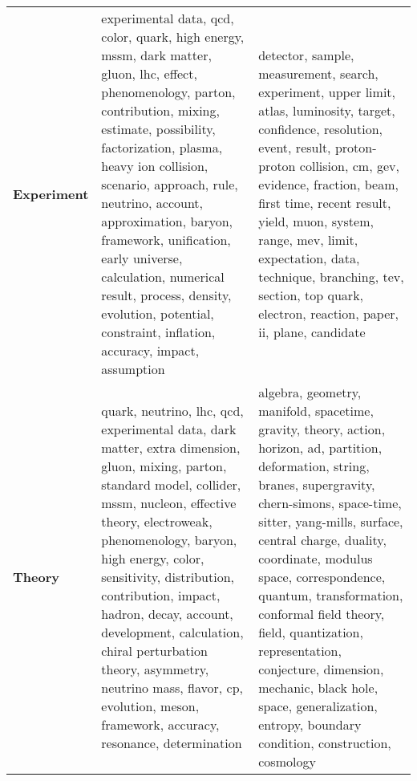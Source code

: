 \begin{longtable}{p{3cm}|p{5cm}|p{5cm}}
\bottomrule
\endlastfoot
\textbf{Experiment} &            experimental data, qcd, color, quark, high energy, mssm, dark matter, gluon, lhc, effect, phenomenology, parton, contribution, mixing, estimate, possibility, factorization, plasma, heavy ion collision, scenario, approach, rule, neutrino, account, approximation, baryon, framework, unification, early universe, calculation, numerical result, process, density, evolution, potential, constraint, inflation, accuracy, impact, assumption &                                                                                             detector, sample, measurement, search, experiment, upper limit, atlas, luminosity, target, confidence, resolution, event, result, proton-proton collision, cm, gev, evidence, fraction, beam, first time, recent result, yield, muon, system, range, mev, limit, expectation, data, technique, branching, tev, section, top quark, electron, reaction, paper, ii, plane, candidate \\
\textbf{Theory    } &  quark, neutrino, lhc, qcd, experimental data, dark matter, extra dimension, gluon, mixing, parton, standard model, collider, mssm, nucleon, effective theory, electroweak, phenomenology, baryon, high energy, color, sensitivity, distribution, contribution, impact, hadron, decay, account, development, calculation, chiral perturbation theory, asymmetry, neutrino mass, flavor, cp, evolution, meson, framework, accuracy, resonance, determination &  algebra, geometry, manifold, spacetime, gravity, theory, action, horizon, ad, partition, deformation, string, branes, supergravity, chern-simons, space-time, sitter, yang-mills, surface, central charge, duality, coordinate, modulus space, correspondence, quantum, transformation, conformal field theory, field, quantization, representation, conjecture, dimension, mechanic, black hole, space, generalization, entropy, boundary condition, construction, cosmology \\
\end{longtable}
